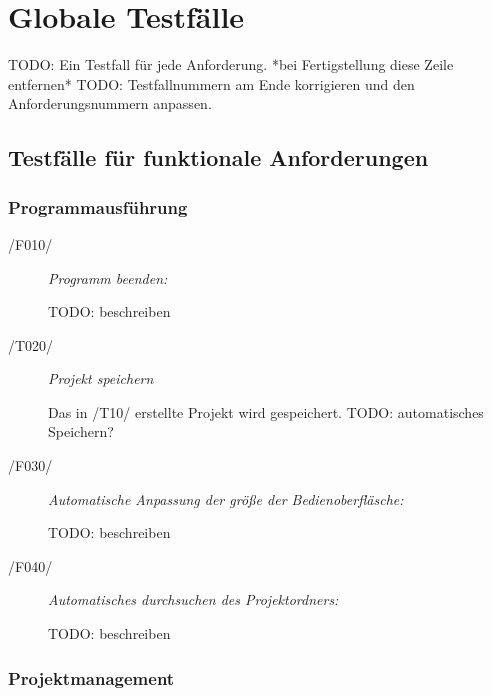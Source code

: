 \section{Globale Testfälle}

TODO: Ein Testfall für jede Anforderung. *bei Fertigstellung diese Zeile entfernen*
TODO: Testfallnummern am Ende korrigieren und den Anforderungsnummern anpassen.

\subsection{Testfälle für funktionale Anforderungen}
	
	\subsubsection{Programmausführung}
	
		\begin{description}

			\item[/F010/] \textit{Programm beenden:}\par TODO: beschreiben		
				
			\item[/T020/] \textit{Projekt speichern}\par Das in /T10/ erstellte Projekt wird gespeichert. TODO: automatisches Speichern?
				
			\item[/F030/] \textit{Automatische Anpassung der größe der Bedienoberfläsche:}\par TODO: beschreiben	
				
			\item[/F040/] \textit{Automatisches durchsuchen des Projektordners:}\par TODO: beschreiben	
		
		\end{description}

	\subsubsection{Projektmanagement}
	
